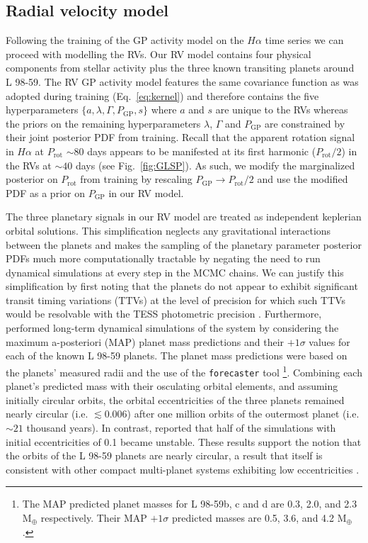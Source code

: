 \documentclass[longauth]{aa}
\newcommand{\prot}{$P_{\text{rot}}$}
\begin{document}
\subsection{Radial velocity model}
\label{sec:rvmodel}
Following the training of the GP activity model on the $H\alpha$ time series we can proceed with modelling the RVs. Our RV model contains four physical components from stellar activity plus the three known transiting planets around L 98-59. The RV GP activity model features the same covariance function as was adopted during training (Eq.~\ref{eq:kernel}) and therefore contains the five hyperparameters $\{ a, \lambda, \Gamma, P_{\text{GP}}, s \}$ where $a$ and $s$ are unique to the RVs whereas the priors on the remaining hyperparameters $\lambda$, $\Gamma$ and $P_{\text{GP}}$ are constrained by their joint posterior PDF from training. Recall that the apparent rotation signal in $H\alpha$ at \prot{} $\sim 80$ days appears to be manifested at its first harmonic (\prot{}$/2$) in the RVs at $\sim 40$ days (see Fig.~\ref{fig:GLSP}). As such, we modify the marginalized posterior on \prot{} from training by rescaling $P_{\text{GP}} \to P_{\text{rot}}/2$ and use the modified PDF as a prior on $P_{\text{GP}}$ in our RV model.

The three planetary signals in our RV model are treated as independent keplerian orbital solutions. This simplification neglects any gravitational interactions between the planets and makes the sampling of the planetary parameter posterior PDFs much more computationally tractable by negating the need to run dynamical simulations at every step in the MCMC chains.
We can justify this simplification by first noting that the planets do not appear to exhibit significant transit timing variations (TTVs) at the level of precision for which such TTVs would be resolvable with the TESS photometric precision . Furthermore,  performed long-term dynamical simulations of the system by considering the maximum a-posteriori (MAP) planet mass predictions and their $+1\sigma$ values for each of the known L 98-59 planets. The planet mass predictions were based on the planets' measured radii and the use of the  \texttt{forecaster} tool \citep{chen17}\footnote{The MAP predicted planet masses for L 98-59b, c and d are 0.3, 2.0, and 2.3 M$_{\oplus}$ respectively. Their MAP $+1\sigma$ predicted masses are 0.5, 3.6, and 4.2 M$_{\oplus}$.}. Combining each planet's predicted mass with their osculating orbital elements, and assuming initially circular orbits, the orbital eccentricities of the three planets remained nearly circular (i.e. $\lesssim 0.006$) after one million orbits of the outermost planet (i.e. $\sim 21$ thousand years). In contrast,  reported that half of the simulations with initial eccentricities of 0.1 became unstable. These results support the notion that the orbits of the L 98-59 planets are nearly circular, a result that itself is consistent with other compact multi-planet systems exhibiting low eccentricities \citep[$\lesssim 0.05$;][]{hadden14,vaneylen15}.
\end{document}
